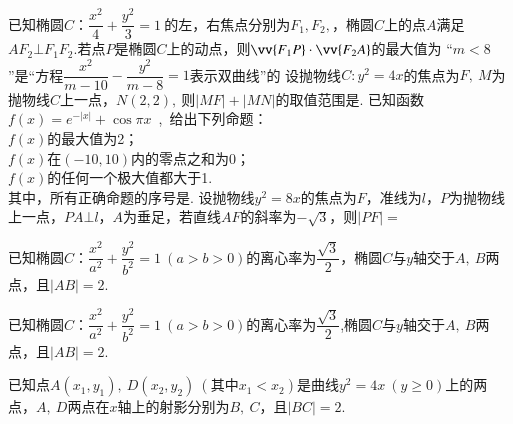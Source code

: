 \documentclass[marginline,noindent,answers,adobefonts]{BHCexam}
\begin{document}
\begin{questions}
\qs 已知椭圆$C$：$\dfrac{x^2}{4}+\dfrac{y^2}{3}=1~$的左，右焦点分别为$ F_1,F_2 ,$，椭圆$C$上的点$ A $满足$ AF_2\bot F_1F_2. $若点$ P $是椭圆$C$上的动点，则$ \vv{F_1P}\cdot\vv{F_2A} $的最大值为\xx
{}
\qs“$ m<8 $”是“方程$\dfrac{x^2}{m-10}-\dfrac{y^2}{m-8}=1$表示双曲线”的\xx
\qs 设抛物线$ C:y^2=4x $的焦点为$ F,~ $$ M $为抛物线$ C $上一点，$ N(2,2) ,~$则$ \left|MF \right|+\left| MN\right|$的取值范围是\tk.
\qs 已知函数$ f(x) =e^{-\left|x\right|}+\cos \pi x$~,~给出下列命题：\\
 $f(x)$的最大值为2；\\
 $f(x)$在$ (-10,10) $内的零点之和为0；\\
 $f(x)$的任何一个极大值都大于1.\\
其中，所有正确命题的序号是\tk.
\qs 设抛物线$ y^2=8x $的焦点为$ F $，准线为$ l $，$ P $为抛物线上一点，$ PA\bm{\bot} l $，$ A $为垂足，若直线$ AF $的斜率为$ -\sqrt{3} $，则$ \left|PF\right|= $\xx
{}

\newpage
\qs 已知椭圆$C$：$\dfrac{x^2}{a^2}+\dfrac{y^2}{b^2}=1~(a>b>0)$的离心率为$ \dfrac{\sqrt{3}}{2} $，椭圆$C$与$ y $轴交于$ A,~B $两点，且$ \left|AB\right|=2 $.
\kongbai
\qs 已知椭圆$C$：$\dfrac{x^2}{a^2}+\dfrac{y^2}{b^2}=1~(a>b>0)$的离心率为$ \dfrac{\sqrt{3}}{2} $,椭圆$C$与$ y $轴交于$ A,~B $两点，且$ \left|AB\right|=2$.
\kongbai
\qs 已知点$ A(x_1,y_1),~D(x_2,y_2)~(\text{其中}x_1<x_2)$是曲线$ y^2=4x~(y\ge0) $上的两点，$ A,~D $两点在$ x $轴上的射影分别为$ B,~C $，且$ |BC|=2. $
\begin{parts}

\end{parts}
\end{questions}
\end{document}
